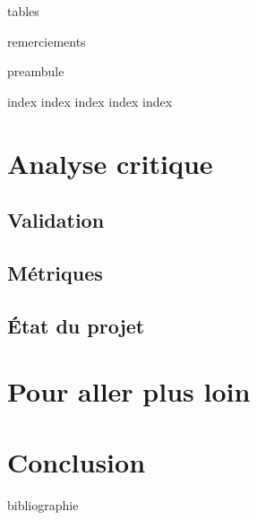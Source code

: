 


\frontmatter

{tables}

\printglossary

{remerciements}

{preambule}

\mainmatter


{index}
{index}
{index}
{index}
{index}

\chapter{Analyse critique}
\section{Validation}
\section{Métriques}
\section{État du projet}

 
\chapter{Pour aller plus loin}

\chapter{Conclusion}

\backmatter

{bibliographie}

